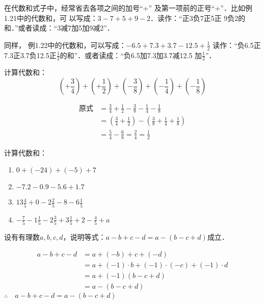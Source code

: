 在代数和式子中，经常省去各项之间的加号“$+$”
及第一项前的正号“$+$”．比如例1.21中的代数和，可
以写成：$3-7+5+9-2$．读作：“正3负7正5正
9负2的和．”或者读成：“3减7加5加9减2”．

同样，
例1.22中的代数和，可以写成：$-6.5+7.3+3.7-12.5+\frac{1}{2}$
读作：“负6.5正7.3正3.7负12.5正$\frac{1}{2}$的和”．或者读成：“负6.5加7.3加3.7减12.5
加$\frac{1}{2}$”．




\begin{example}
 计算代数和：
 \[\left(+\frac{3}{4}\right)+\left(+\frac{1}{2}\right)+\left(-\frac{3}{8}\right)+\left(-\frac{1}{4}\right)+\left(-\frac{1}{8}\right)  \]   
\end{example}


\begin{solution}
      \begin{align*}
    \text{原式}&=\frac{3}{4}+\frac{1}{2}-\frac{3}{8}-\frac{1}{4}-\frac{1}{8}  \tag{简化代数和}\\
    &=\left(\frac{3}{4}+\frac{1}{2}\right)-\left(\frac{3}{8}+\frac{1}{4}+\frac{1}{8}\right)\\
    &=\frac{5}{4}-\frac{6}{8}=\frac{2}{4}=\frac{1}{2}
\end{align*}  
\end{solution}

\begin{ex}
计算代数和：
\begin{enumerate}
    \item $0+(-24)+(-5)+7$
    \item $-7.2-0.9-5.6+1.7$
    \item $13\frac{4}{5}+0-2\frac{2}{5}-8-6\frac{1}{5}$
    \item $-\frac{7}{5}-1\frac{1}{5}-2\frac{3}{5}+3\frac{1}{5}+2-\frac{4}{5}+a$
\end{enumerate} 
\end{ex}

\begin{example}
    设有有理数$a,b,c,d$，说明等式：$a-b+c-d=a-(b-c+d)$成立．
\end{example}

\begin{solution}
\begin{align*}
    a-b+c-d&= a+(-b)+c+(-d) \tag{代数和原意}\\
    &=a+ (-1)\cdot b+(-1)\cdot (-c)+(-1)\cdot d  \tag{相反数意义}\\
&=a+(-1)(b-c+d) \tag{分配律}\\
&=a-(b-c+d)  \tag{相反数意义}    
\end{align*}    
$\therefore\quad a-b+c-d=a-(b-c+d)$
\end{solution}

